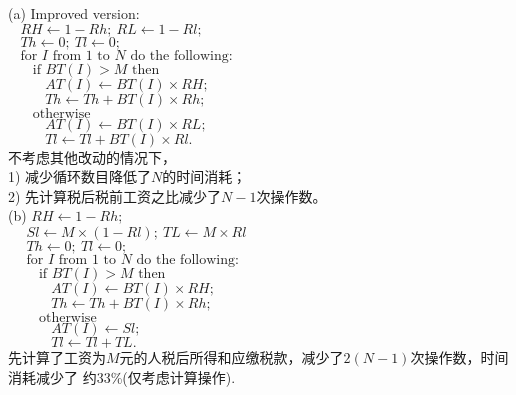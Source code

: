 \documentclass[11pt, a4paper, UTF8]{ctexart}
\begin{document}


\begin{solution}
  (a) Improved version:\\
  $~~~~RH \gets 1 - Rh;~RL \gets 1 - Rl;$\\
  $~~~~Th \gets 0;~Tl \gets 0;$\\
  $~~~~\text{for } I \text{ from 1 to } N \text{ do the following:}$\\
  $~~~~~~~~\text{if } BT(I) > M \text{ then}$\\
  $~~~~~~~~~~~~AT(I) \gets BT(I) \times RH;$\\
  $~~~~~~~~~~~~Th \gets Th + BT(I) \times Rh;$\\
  $~~~~~~~~\text{otherwise}$\\
  $~~~~~~~~~~~~AT(I) \gets BT(I) \times RL;$\\
  $~~~~~~~~~~~~Tl \gets Tl + BT(I) \times Rl.$\\
  不考虑其他改动的情况下，\\
  1) 减少循环数目降低了$N$的时间消耗；\\
  2) 先计算税后税前工资之比减少了$N - 1$次操作数。\\
  (b) $RH \gets 1 - Rh;$\\
  $~~~~~~Sl \gets M \times (1 - Rl);~TL \gets M \times Rl$\\
  $~~~~~~Th \gets 0;~Tl \gets 0;$\\
  $~~~~~~\text{for } I \text{ from 1 to } N \text{ do the following:}$\\
  $~~~~~~~~~~\text{if } BT(I) > M \text{ then}$\\
  $~~~~~~~~~~~~~~AT(I) \gets BT(I) \times RH;$\\
  $~~~~~~~~~~~~~~Th \gets Th + BT(I) \times Rh;$\\
  $~~~~~~~~~~\text{otherwise}$\\
  $~~~~~~~~~~~~~~AT(I) \gets Sl;$\\
  $~~~~~~~~~~~~~~Tl \gets Tl + TL.$\\
  先计算了工资为$M$元的人税后所得和应缴税款，减少了$2(N - 1)$次操作数，时间消耗减少了
  约33\%(仅考虑计算操作).
\end{solution}
\end{document}
